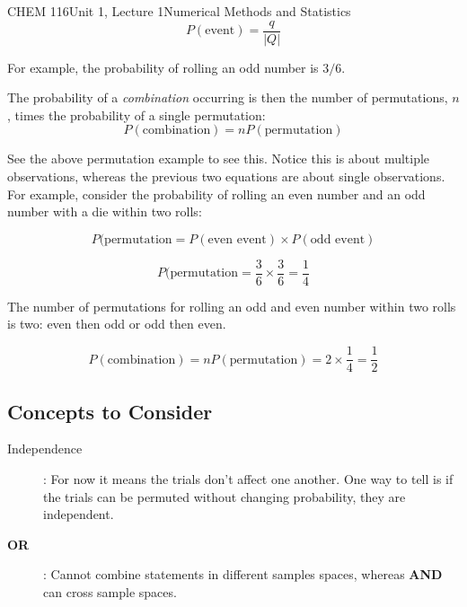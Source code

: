 \documentclass{article}
\begin{document}
\begin{tdoc}{CHEM 116}{Unit 1, Lecture 1}{Numerical Methods and Statistics}
\begin{equation}
P(\textrm{event}) = \frac{q}{|Q|}
\end{equation}

For example, the probability of rolling an odd number is $3 / 6$. 


The probability of a \emph{combination} occurring is then the number of
permutations, $n$, times the probability of a single permutation:
\begin{equation}
P(\textrm{combination}) = n P(\textrm{permutation})
\end{equation}
\vspace{0.2cm}

See the above permutation example to see this. Notice this is about multiple observations, whereas the previous two equations are about single observations. For example, consider the probability of rolling an even number and an odd number with a die within two rolls:

\begin{equation}
P(\textrm{permutation} = P(\textrm{even event}) \times P(\textrm{odd event})
\end{equation}

\begin{equation}
P(\textrm{permutation} = \frac{3}{6} \times \frac{3}{6} = \frac{1}{4}
\end{equation}

The number of permutations for rolling an odd and even number within two rolls is two: even then odd or odd then even.

\begin{equation}
P(\textrm{combination}) = n P(\textrm{permutation}) = 2 \times \frac{1}{4} = \frac{1}{2}
\end{equation}

\subsection{Concepts to Consider}

\begin{description}

\item [Independence]: For now it means the trials don't affect one
another. One way to tell is if the trials can be permuted without changing probability, they are
independent.\vspace{0.2cm}\\

\item[{\bf OR}]: Cannot combine statements in different samples spaces, whereas {\bf AND} can cross sample spaces.\vspace{0.2cm}\\


\end{description}
\end{tdoc}
\end{document}
